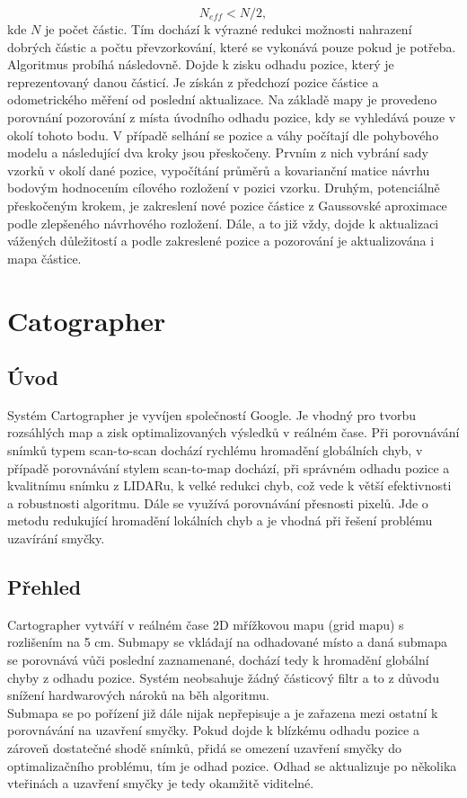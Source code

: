 \documentclass[12pt]{article}
\begin{document}
\begin{equation}
	N_{eff} < N/2,
\end{equation}
kde $N$ je počet částic. Tím dochází k výrazné redukci možnosti nahrazení dobrých částic a počtu převzorkování, které se vykonává pouze pokud je potřeba.\\
\indent Algoritmus probíhá následovně. Dojde k zisku odhadu pozice, který je reprezentovaný danou částicí. Je získán z předchozí pozice částice a odometrického měření od poslední aktualizace. Na základě mapy je provedeno porovnání pozorování z místa úvodního odhadu pozice, kdy se vyhledává pouze v okolí tohoto bodu. V případě selhání se pozice a váhy počítají dle pohybového modelu a následující dva kroky jsou přeskočeny. Prvním z nich vybrání sady vzorků v okolí dané pozice, vypočítání průměrů a kovarianční matice návrhu bodovým hodnocením cílového rozložení v pozici vzorku. Druhým, potenciálně přeskočeným krokem, je zakreslení nové pozice částice z Gaussovské aproximace podle zlepšeného návrhového rozložení. Dále, a to již vždy, dojde k aktualizaci vážených důležitostí a podle zakreslené pozice a pozorování je aktualizována i mapa částice. 
 
\newpage

\section{Catographer}

\subsection{Úvod}
Systém Cartographer je vyvíjen společností Google. Je vhodný pro tvorbu rozsáhlých map a zisk optimalizovaných výsledků v reálném čase. Při porovnávání snímků typem scan-to-scan dochází rychlému hromadění globálních chyb, v případě porovnávání stylem scan-to-map dochází, při správném odhadu pozice a kvalitnímu snímku z LIDARu, k velké redukci chyb, což vede k větší efektivnosti a robustnosti algoritmu. Dále se využívá porovnávání přesnosti pixelů. Jde o metodu redukující hromadění lokálních chyb a je vhodná při řešení problému uzavírání smyčky. \\

\subsection{Přehled}
Cartographer vytváří v reálném čase 2D mřížkovou mapu (grid mapu) s rozlišením na 5 cm. Submapy se vkládají na odhadované místo a daná submapa se porovnává vůči poslední zaznamenané, dochází tedy k hromadění globální chyby z odhadu pozice. Systém neobsahuje žádný částicový filtr a to z důvodu snížení hardwarových nároků na běh algoritmu.\\
\indent Submapa se po pořízení již dále nijak nepřepisuje a je zařazena mezi ostatní k porovnávání na uzavření smyčky. Pokud dojde k blízkému odhadu pozice a zároveň dostatečné shodě snímků, přidá se omezení uzavření smyčky do optimalizačního problému, tím je odhad pozice. Odhad se aktualizuje po několika vteřinách a uzavření smyčky je tedy okamžitě viditelné. 
\end{document}
